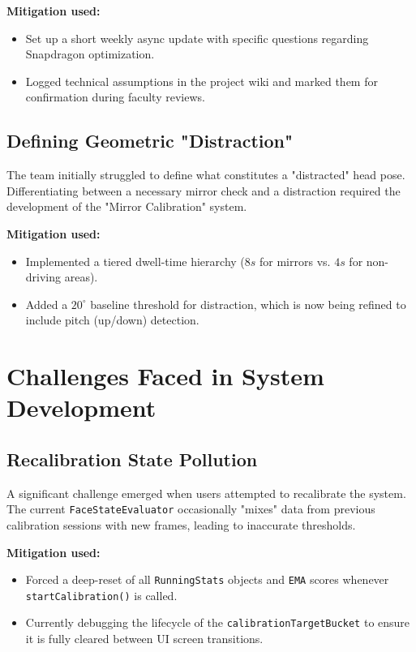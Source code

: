 \documentclass[11pt]{report}
\begin{document}
\textbf{Mitigation used:}
\begin{itemize}
    \item Set up a short weekly async update with specific questions regarding Snapdragon optimization.
    \item Logged technical assumptions in the project wiki and marked them for confirmation during faculty reviews.
\end{itemize}

\subsection{Defining Geometric "Distraction"}
The team initially struggled to define what constitutes a "distracted" head pose. Differentiating between a necessary mirror check and a distraction required the development of the "Mirror Calibration" system.

\textbf{Mitigation used:}
\begin{itemize}
    \item Implemented a tiered dwell-time hierarchy ($8s$ for mirrors vs. $4s$ for non-driving areas).
    \item Added a $20^\circ$ baseline threshold for distraction, which is now being refined to include pitch (up/down) detection.
\end{itemize}

\section{Challenges Faced in System Development}

\subsection{Recalibration State Pollution}
A significant challenge emerged when users attempted to recalibrate the system. The current \texttt{FaceStateEvaluator} occasionally "mixes" data from previous calibration sessions with new frames, leading to inaccurate thresholds.

\textbf{Mitigation used:}
\begin{itemize}
    \item Forced a deep-reset of all \texttt{RunningStats} objects and \texttt{EMA} scores whenever \texttt{startCalibration()} is called.
    \item Currently debugging the lifecycle of the \texttt{calibrationTargetBucket} to ensure it is fully cleared between UI screen transitions.
\end{itemize}
\end{document}
